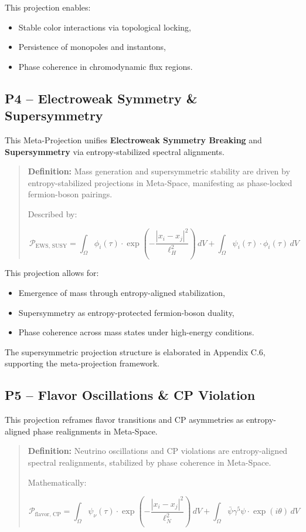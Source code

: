 \documentclass[10.5pt,a4paper]{article}
\begin{document}
This projection enables:
\begin{itemize}
    \item Stable color interactions via topological locking,
    \item Persistence of monopoles and instantons,
    \item Phase coherence in chromodynamic flux regions.
\end{itemize}

\subsection{P4 – Electroweak Symmetry \& Supersymmetry}

This Meta-Projection unifies \textbf{Electroweak Symmetry Breaking} and \textbf{Supersymmetry} 
via entropy-stabilized spectral alignments.

\begin{quote}
\textbf{Definition:}  
Mass generation and supersymmetric stability are driven by entropy-stabilized projections in Meta-Space, 
manifesting as phase-locked fermion-boson pairings.

Described by:

\[
\mathcal{P}_{\text{EWS, SUSY}} = \int_\Omega \phi_i(\tau) \cdot \exp\left(-\frac{|x_i - x_j|^2}{\ell_H^2}\right) \, dV 
+ \int_\Omega \psi_i(\tau) \cdot \phi_i(\tau) \, dV
\]
\end{quote}

This projection allows for:
\begin{itemize}
    \item Emergence of mass through entropy-aligned stabilization,
    \item Supersymmetry as entropy-protected fermion-boson duality,
    \item Phase coherence across mass states under high-energy conditions.
\end{itemize}

The supersymmetric projection structure is elaborated in Appendix C.6, supporting the meta-projection framework.

\subsection{P5 – Flavor Oscillations \& CP Violation}

This projection reframes flavor transitions and CP asymmetries as entropy-aligned phase realignments in Meta-Space.

\begin{quote}
\textbf{Definition:}  
Neutrino oscillations and CP violations are entropy-aligned spectral realignments, stabilized by phase coherence in Meta-Space.

Mathematically:

\[
\mathcal{P}_{\text{flavor, CP}} = \int_\Omega \psi_\nu(\tau) \cdot \exp\left(-\frac{|x_i - x_j|^2}{\ell_N^2}\right) \, dV 
+ \int_\Omega \bar{\psi} \gamma^5 \psi \cdot \exp(i\theta) \, dV
\]
\end{quote}
\end{document}
